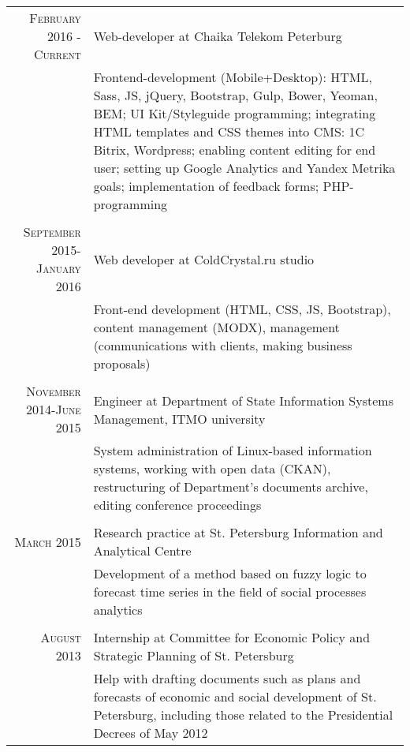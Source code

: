 \documentclass[a4paper,10pt]{article} %
\begin{document}
\begin{tabular}{r|p{11cm}}
    \textsc{February 2016 - Current} & Web-developer at Chaika Telekom Peterburg\\
    & \footnotesize{Frontend-development (Mobile+Desktop): HTML, Sass, JS, jQuery,
        Bootstrap, Gulp, Bower, Yeoman, BEM; UI Kit/Styleguide programming; 
        integrating HTML templates and CSS themes into CMS: 1C Bitrix, Wordpress; 
        enabling content editing for end user; setting up Google Analytics and
        Yandex Metrika goals; implementation of feedback forms; PHP-programming}\\
\multicolumn{2}{c}{} \\
    \textsc{September 2015-January 2016} & Web developer at ColdCrystal.ru studio \\
    & \footnotesize{Front-end development (HTML, CSS, JS, Bootstrap), content
management (MODX), management (communications with clients, making business
proposals)}\\
\multicolumn{2}{c}{} \\
    \textsc{November 2014-June 2015} & Engineer at Department of State
Information Systems Management, ITMO university \\
    & \footnotesize{System administration of Linux-based information systems,
        working with open data (CKAN), restructuring of Department's documents archive,
        editing conference proceedings}\\
\multicolumn{2}{c}{} \\
\textsc{March 2015} & Research practice at St. Petersburg Information and Analytical Centre \\
                    & \footnotesize{Development of a method based on fuzzy logic to forecast time series in the field of social processes analytics }\\
\multicolumn{2}{c}{} \\


\textsc{August 2013} & Internship at Committee for Economic Policy and Strategic Planning of St. Petersburg \\
& \footnotesize{ Help with drafting documents such as plans and forecasts of
economic and social development of St. Petersburg, including those related to
the Presidential Decrees of May 2012 }
\end{tabular}

\end{document}
